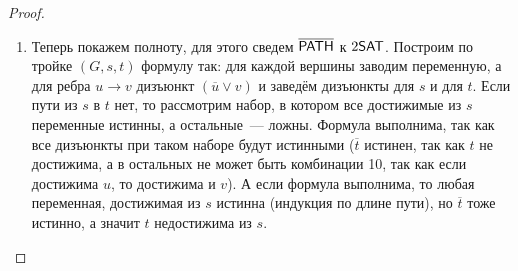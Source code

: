 \begin{proof}
\begin{enumerate}
    Теперь, если в дизъюнкте $(z \lor t)$ $z$ стал ложью, то есть путь $x \to \overline{z}$, а еще есть ребро $\overline{z} \to t$ по построению, тогда $t$ достижим, и он истинен. Значит в каждой скобке либо хотя бы одна ложь, либо оба неизвестны (это легко решается тем, что эти переменные могут быть любыми).

    Получается, свели $2\sat$ к проверке отсутствия нескольких путей, а это задача из $\nlsp$. Тогда в сертификате проверяем все $2n$ путей в порядке возрастания.

    \item Теперь покажем полноту, для этого сведем $\overline{\mathsf{PATH}}$ к $2\sat$. Построим по тройке $(G, s, t)$ формулу так: для каждой вершины заводим переменную, а для ребра $u \to v$ дизъюнкт $(\overline{u} \lor v)$ и заведём дизъюнкты для $s$ и для $t$. Если пути из $s$ в $t$ нет, то рассмотрим набор, в котором все достижимые из $s$ переменные истинны, а остальные~--- ложны. Формула выполнима, так как все дизъюнкты при таком наборе будут истинными ($\overline{t}$ истинен, так как $t$ не достижима, а в остальных не может быть комбинации 10, так как если достижима $u$, то достижима и $v$).  А если формула выполнима, то любая переменная, достижимая из $s$ истинна (индукция по длине пути), но $\overline{t}$ тоже истинно, а значит $t$ недостижима из $s$.
\end{enumerate}

\end{proof}
